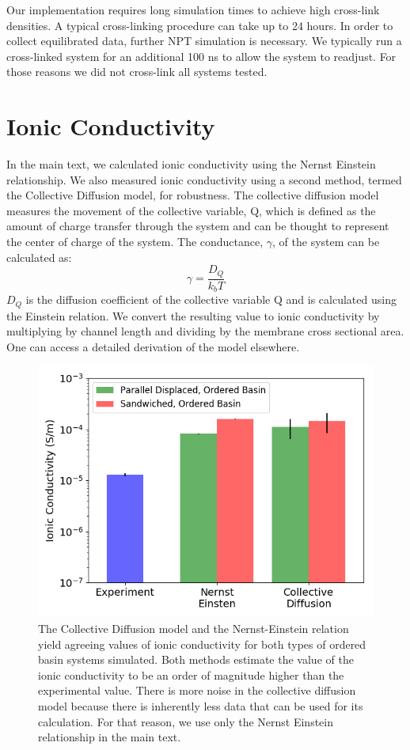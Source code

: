 \documentclass[journal=jpcbfk,manusciprt=article]{achemso}
\begin{document}
  Our implementation requires long simulation times to achieve high cross-link 
  densities. A typical cross-linking procedure can take up to 24 hours. In
  order to collect equilibrated data, further NPT simulation is necessary. We
  typically run a cross-linked system for an additional 100 ns to allow the system
  to readjust. For those reasons we did not cross-link all systems tested.
  
  \section{Ionic Conductivity}\label{section:ionic_conductivity}
  
  In the main text, we calculated ionic conductivity using the Nernst Einstein 
  relationship. We also measured ionic conductivity using a second method, 
  termed the Collective Diffusion model, for robustness. The collective 
  diffusion model measures the movement of the collective variable, Q, which
  is defined as the amount of charge transfer through the system and can be 
  thought to represent the center of charge of the system. The conductance, 
  $\gamma$, of the system can be calculated as:
  \begin{equation}
	 \gamma = \dfrac{D_Q}{k_b T} 
	\label{eqn:collective_diffusion}
  \end{equation}
  $D_Q$ is the diffusion coefficient of the collective variable Q and is 
  calculated using the Einstein relation. We convert the resulting value
  to ionic conductivity by multiplying by channel length and dividing by
  the membrane cross sectional area. One can access a detailed derivation of 
  the model elsewhere\cite{liu_collective_2013}.
  
  \begin{figure}[!htb]
        \centering
        \includegraphics[width=0.5\linewidth]{Ionic_conductivity.png}
        \caption{The Collective Diffusion model and the Nernst-Einstein relation yield
        agreeing values of ionic conductivity for both types of ordered basin systems 
        simulated. Both methods estimate the value of the ionic conductivity to be an 
        order of magnitude higher than the experimental value. There is more noise in
        the collective diffusion model because there is inherently less data that 
        can be used for its calculation. For that reason, we use only the Nernst 
        Einstein relationship in the main text.}
        \label{fig:conductivity}
  \end{figure}
\end{document}

